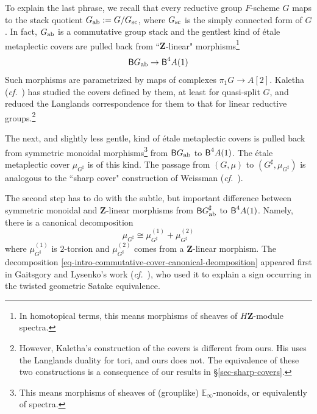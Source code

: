 \documentclass[10pt,english,reqno]{amsart}
\newcommand{\integers}{\mathbf Z}
\newcommand{\deloop}{\textnormal{\textsf{B}}}
\newcommand{\sconn}{\textnormal{sc}}
\newcommand{\abelian}{\textnormal{ab}}
\theoremstyle{definition}
\numberwithin{equation}{section}
\begin{document}
To explain the last phrase, we recall that every reductive group $F$-scheme $G$ maps to the stack quotient $G_{\abelian} := G/G_{\sconn}$, where $G_{\sconn}$ is the simply connected form of $G$. In fact, $G_{\abelian}$ is a commutative group stack and the gentlest kind of \'etale metaplectic covers are pulled back from ``$\integers$-linear" morphisms\footnote{In homotopical terms, this means morphisms of sheaves of $H\integers$-module spectra.}
$$
\deloop G_{\abelian} \rightarrow \deloop^4A(1)
$$
Such morphisms are parametrized by maps of complexes $\pi_1 G \rightarrow A[2]$. Kaletha (\emph{cf.}~\cite{kaletha2022}) has studied the covers defined by them, at least for quasi-split $G$, and reduced the Langlands correspondence for them to that for linear reductive groups.\footnote{However, Kaletha's construction of the covers is different from ours. His uses the Langlands duality for tori, and ours does not. The equivalence of these two constructions is a consequence of our results in \S\ref{sec-sharp-covers}.}

The next, and slightly less gentle, kind of \'etale metaplectic covers is pulled back from symmetric monoidal morphisms\footnote{This means morphisms of sheaves of (grouplike) $\mathbb E_{\infty}$-monoids, or equivalently of spectra.} from $\deloop G_{\abelian}$ to $\deloop^4A(1)$. The \'etale metaplectic cover $\mu_{G^{\sharp}}$ is of this kind. The passage from $(G, \mu)$ to $(G^{\sharp}, \mu_{G^{\sharp}})$ is analogous to the ``sharp cover" construction of Weissman (\emph{cf.}~\cite{MR3802418}).

The second step has to do with the subtle, but important difference between symmetric monoidal and $\integers$-linear morphisms from $\deloop G^{\sharp}_{\abelian}$ to $\deloop^4A(1)$. Namely, there is a canonical decomposition
	\begin{equation}
	\label{eq-intro-commutative-cover-canonical-deomposition}
	\mu_{G^{\sharp}} \cong \mu_{G^{\sharp}}^{(1)} + \mu_{G^{\sharp}}^{(2)}
	\end{equation}
where $\mu_{G^{\sharp}}^{(1)}$ is $2$-torsion and $\mu_{G^{\sharp}}^{(2)}$ comes from a $\integers$-linear morphism. The decomposition \eqref{eq-intro-commutative-cover-canonical-deomposition} appeared first in Gaitsgory and Lysenko's work (\emph{cf.}~\cite{MR3769731}), who used it to explain a sign occurring in the twisted geometric Satake equivalence.
\end{document}
